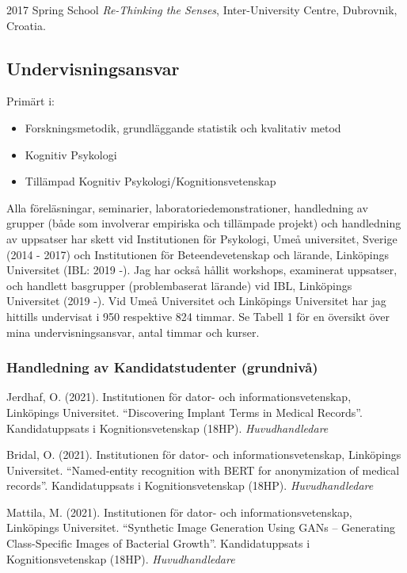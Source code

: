 \documentclass[]{article}
\providecommand{\tightlist}{%
  \setlength{\itemsep}{0pt}\setlength{\parskip}{0pt}}
\begin{document}
2017 Spring School \emph{Re-Thinking the Senses}, Inter-University
Centre, Dubrovnik, Croatia.

\hypertarget{undervisningsansvar}{%
\subsection{Undervisningsansvar}\label{undervisningsansvar}}

Primärt i:

\begin{itemize}
\tightlist
\item
  Forskningsmetodik, grundläggande statistik och kvalitativ metod
\item
  Kognitiv Psykologi
\item
  Tillämpad Kognitiv Psykologi/Kognitionsvetenskap
\end{itemize}

Alla föreläsningar, seminarier, laboratoriedemonstrationer, handledning
av grupper (både som involverar empiriska och tillämpade projekt) och
handledning av uppsatser har skett vid Institutionen för Psykologi, Umeå
universitet, Sverige (2014 - 2017) och Institutionen för
Beteendevetenskap och lärande, Linköpings Universitet (IBL: 2019 -). Jag
har också hållit workshops, examinerat uppsatser, och handlett
basgrupper (problembaserat lärande) vid IBL, Linköpings Universitet
(2019 -). Vid Umeå Universitet och Linköpings Universitet har jag
hittills undervisat i 950 respektive 824 timmar. Se Tabell 1 för en
översikt över mina undervisningsansvar, antal timmar och kurser.

\hypertarget{handledning-av-kandidatstudenter-grundnivuxe5}{%
\subsubsection{Handledning av Kandidatstudenter
(grundnivå)}\label{handledning-av-kandidatstudenter-grundnivuxe5}}

Jerdhaf, O. (2021). Institutionen för dator- och informationsvetenskap,
Linköpings Universitet. ``Discovering Implant Terms in Medical
Records''. Kandidatuppsats i Kognitionsvetenskap (18HP).
\emph{Huvudhandledare}

Bridal, O. (2021). Institutionen för dator- och informationsvetenskap,
Linköpings Universitet. ``Named-entity recognition with BERT for
anonymization of medical records''. Kandidatuppsats i
Kognitionsvetenskap (18HP). \emph{Huvudhandledare}

Mattila, M. (2021). Institutionen för dator- och informationsvetenskap,
Linköpings Universitet. ``Synthetic Image Generation Using GANs --
Generating Class-Specific Images of Bacterial Growth''. Kandidatuppsats
i Kognitionsvetenskap (18HP). \emph{Huvudhandledare}
\end{document}
